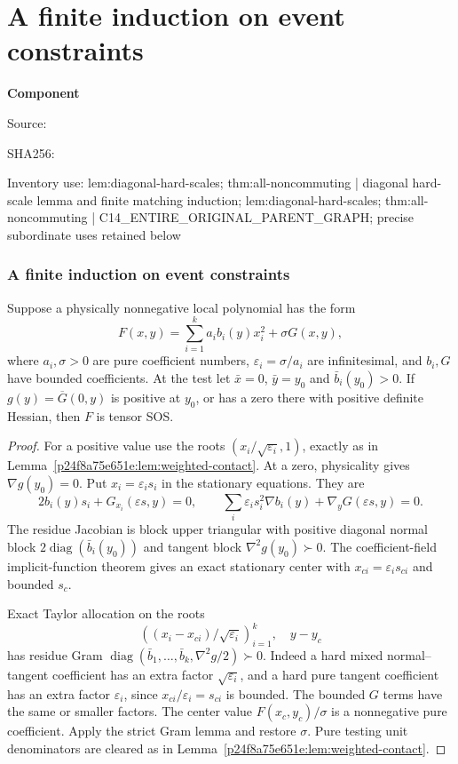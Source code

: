 \chapter{A finite induction on event constraints}
\label{component:p94dfbc8a5970}
\noindent\textbf{Component }\par
{\small\noindent Source: \par}
{\small\noindent SHA256: \par}
{\small\noindent Inventory use: lem:diagonal-hard-scales; thm:all-noncommuting | diagonal hard-scale lemma and finite matching induction; lem:diagonal-hard-scales; thm:all-noncommuting | C14\_\allowbreak{}ENTIRE\_\allowbreak{}ORIGINAL\_\allowbreak{}PARENT\_\allowbreak{}GRAPH; precise subordinate uses retained below\par}
\medskip
\subsection{A finite induction on event constraints}
\begin{lemma}\label{p94dfbc8a5970:lem:diagonal-hard-scales}
Suppose a physically nonnegative local polynomial has the form
\[
F(x,y)=\sum_{i=1}^k a_i b_i(y)x_i^2+\sigma G(x,y),
\]
where $a_i,\sigma>0$ are pure coefficient numbers,
$\varepsilon_i=\sigma/a_i$ are infinitesimal, and $b_i,G$ have bounded coefficients. At the test let $\bar x=0$, $\bar y=y_0$ and $\bar b_i(y_0)>0$. If $g(y)=\overline G(0,y)$ is positive at $y_0$, or has a zero there with positive definite Hessian, then $F$ is tensor SOS.
\end{lemma}
\begin{proof}
For a positive value use the roots $(x_i/\sqrt{\varepsilon_i},1)$, exactly as in Lemma~\ref{p24f8a75e651e:lem:weighted-contact}. At a zero, physicality gives $\nabla g(y_0)=0$. Put $x_i=\varepsilon_i s_i$ in the stationary equations. They are
\[
2b_i(y)s_i+G_{x_i}(\varepsilon s,y)=0,
\qquad
\sum_i\varepsilon_i s_i^2\nabla b_i(y)+\nabla_yG(\varepsilon s,y)=0.
\]
The residue Jacobian is block upper triangular with positive diagonal normal block $2\operatorname{diag}(\bar b_i(y_0))$ and tangent block $\nabla^2g(y_0)\succ0$. The coefficient-field implicit-function theorem gives an exact stationary center with $x_{ci}=\varepsilon_i s_{ci}$ and bounded $s_c$.

Exact Taylor allocation on the roots
\[
\left((x_i-x_{ci})/\sqrt{\varepsilon_i}\right)_{i=1}^k,
\quad y-y_c
\]
has residue Gram
$\operatorname{diag}(\bar b_1,\ldots,\bar b_k,\nabla^2g/2)\succ0$.
Indeed a hard mixed normal--tangent coefficient has an extra factor $\sqrt{\varepsilon_i}$, and a hard pure tangent coefficient has an extra factor $\varepsilon_i$, since $x_{ci}/\varepsilon_i=s_{ci}$ is bounded. The bounded $G$ terms have the same or smaller factors. The center value $F(x_c,y_c)/\sigma$ is a nonnegative pure coefficient. Apply the strict Gram lemma and restore $\sigma$. Pure testing unit denominators are cleared as in Lemma~\ref{p24f8a75e651e:lem:weighted-contact}.
\end{proof}

